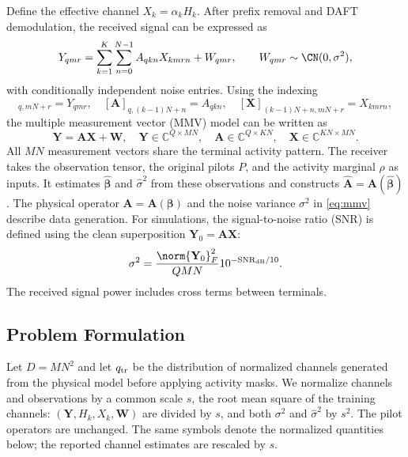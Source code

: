 Define the effective channel $X_k=\alpha_kH_k$.
After prefix removal and DAFT demodulation, the received signal can be expressed as
\begin{equation}
 Y_{qmr}=\sum_{k=1}^K\sum_{n=0}^{N-1}A_{qkn}X_{kmrn}+W_{qmr},
 \qquad W_{qmr}\sim\CN(0,\sigma^2),
 \label{eq:observation-tensor}
\end{equation}
with conditionally independent noise entries.
Using the indexing
\begin{equation}
 [\mathbf Y]_{q,mN+r}=Y_{qmr},\quad
 [\mathbf A]_{q,(k-1)N+n}=A_{qkn},\quad
 [\mathbf X]_{(k-1)N+n,mN+r}=X_{kmrn},
 \label{eq:mmv-indexing}
\end{equation}
the multiple measurement vector (MMV) model can be written as
\begin{equation}
 \mathbf Y=\mathbf A\mathbf X+\mathbf W,\quad
 \mathbf Y\in\mathbb C^{Q\times MN},\quad
 \mathbf A\in\mathbb C^{Q\times KN},\quad
 \mathbf X\in\mathbb C^{KN\times MN}.
 \label{eq:mmv}
\end{equation}
All $MN$ measurement vectors share the terminal activity pattern.
The receiver takes the observation tensor, the original pilots $P$,
and the activity marginal $\rho$ as inputs. It estimates
$\widehat{\bm\beta}$ and $\widehat\sigma^2$ from these observations
and constructs $\widehat{\mathbf A}=\mathbf A(\widehat{\bm\beta})$.
The physical operator $\mathbf A=\mathbf A(\bm\beta)$ and the noise
variance $\sigma^2$ in \eqref{eq:mmv} describe data generation.
For simulations, the signal-to-noise ratio (SNR)
is defined using the clean superposition $\mathbf Y_0=\mathbf A\mathbf X$:
\begin{equation}
 \sigma^2=\frac{\norm{\mathbf Y_0}_F^2}{QMN}
 10^{-\mathrm{SNR}_{\rm dB}/10}.
 \label{eq:snr}
\end{equation}
The received signal power includes cross terms between terminals.

\subsection{Problem Formulation}

Let $D=MN^2$ and let $q_{\rm tr}$ be the distribution of normalized channels
generated from the physical model before applying activity masks.
We normalize channels and observations by a common scale $s$,
the root mean square of the training channels:
$(\mathbf Y,H_k,X_k,\mathbf W)$ are divided by $s$, and both
$\sigma^2$ and $\widehat\sigma^2$ by $s^2$. The pilot operators are
unchanged. The same symbols denote the normalized quantities below;
the reported channel estimates are rescaled by $s$.

